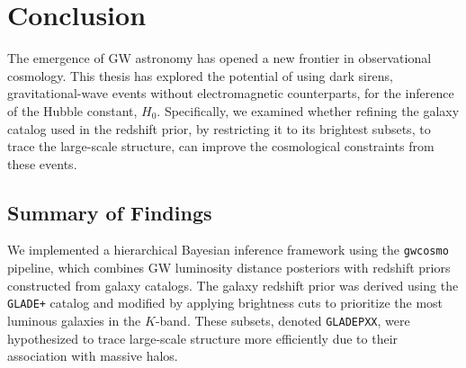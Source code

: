 \chapter{Conclusion}
\label{chap:conclusion}

The emergence of \ac{GW} astronomy has opened a new frontier in observational cosmology. This thesis has explored the potential of using dark sirens, gravitational-wave events without electromagnetic counterparts, for the inference of the Hubble constant, $H_0$. Specifically, we examined whether refining the galaxy catalog used in the redshift prior, by restricting it to its brightest subsets, to trace the large-scale structure, can improve the cosmological constraints from these events.

\section{Summary of Findings}

We implemented a hierarchical Bayesian inference framework using the \texttt{gwcosmo} pipeline, which combines \ac{GW} luminosity distance posteriors with redshift priors constructed from galaxy catalogs. The galaxy redshift prior was derived using the \texttt{GLADE+} catalog and modified by applying brightness cuts to prioritize the most luminous galaxies in the $K$-band. These subsets, denoted \texttt{GLADEPXX}, were hypothesized to trace large-scale structure more efficiently due to their association with massive halos.

